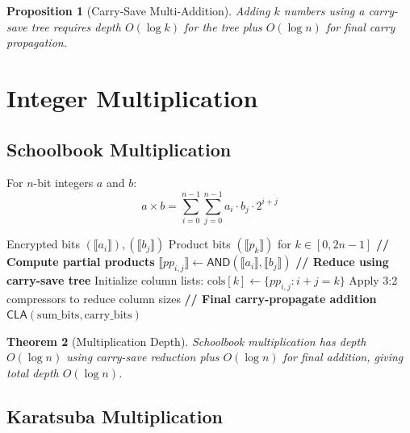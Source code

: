 \documentclass[11pt,a4paper]{article}
\newtheorem{theorem}{Theorem}[section]
\newtheorem{proposition}[theorem]{Proposition}
\begin{document}
\begin{proposition}[Carry-Save Multi-Addition]
Adding $k$ numbers using a carry-save tree requires depth $O(\log k)$ for the tree plus $O(\log n)$ for final carry propagation.
\end{proposition}

\section{Integer Multiplication}

\subsection{Schoolbook Multiplication}

For $n$-bit integers $a$ and $b$:
\begin{equation}
a \times b = \sum_{i=0}^{n-1} \sum_{j=0}^{n-1} a_i \cdot b_j \cdot 2^{i+j}
\end{equation}

\begin{algorithm}
\caption{Schoolbook Multiplication}
\begin{algorithmic}[1]
\Require Encrypted bits $(\llbracket a_i \rrbracket), (\llbracket b_j \rrbracket)$
\Ensure Product bits $(\llbracket p_k \rrbracket)$ for $k \in [0, 2n-1]$
\State \textbf{// Compute partial products}
    \State $\llbracket pp_{i,j} \rrbracket \gets \textsf{AND}(\llbracket a_i \rrbracket, \llbracket b_j \rrbracket)$
\EndFor
\State \textbf{// Reduce using carry-save tree}
\State Initialize column lists: $\text{cols}[k] \gets \{pp_{i,j} : i + j = k\}$
    \State Apply 3:2 compressors to reduce column sizes
\EndWhile
\State \textbf{// Final carry-propagate addition}
\State \Return $\textsf{CLA}(\text{sum\_bits}, \text{carry\_bits})$
\end{algorithmic}
\end{algorithm}

\begin{theorem}[Multiplication Depth]
Schoolbook multiplication has depth $O(\log n)$ using carry-save reduction plus $O(\log n)$ for final addition, giving total depth $O(\log n)$.
\end{theorem}

\subsection{Karatsuba Multiplication}
\end{document}
